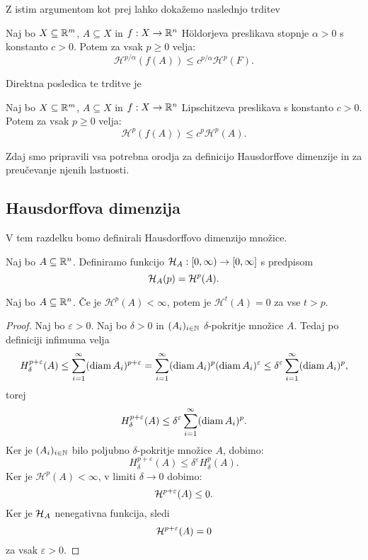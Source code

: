 Z istim argumentom kot prej lahko dokažemo naslednjo trditev
\begin{trditev}
    \label{mera-hold}
    Naj bo \(X \subseteq \mathbb{R}^m\), \(A \subseteq X\) in \(f: X \to \mathbb{R}^n\) Höldorjeva preslikava stopnje \(\alpha > 0\) s konstanto \(c > 0\). Potem za vsak \(p \geq 0\) velja:
    \[\mathcal{H}^{p/\alpha}(f(A)) \leq c^{p/\alpha} \mathcal{H}^p(F).\]
\end{trditev}

Direktna posledica te trditve je 
\begin{posledica}
    Naj bo \(X \subseteq \mathbb{R}^m\), \(A \subseteq X\) in \(f: X \to \mathbb{R}^n\) Lipschitzeva preslikava s konstanto \(c > 0\). Potem za vsak \(p \geq 0\) velja:
    \[\mathcal{H}^{p}(f(A)) \leq c^p \mathcal{H}^p(A).\]
\end{posledica}

Zdaj smo pripravili vsa potrebna orodja za definicijo Hausdorffove dimenzije in za preučevanje njenih lastnosti.

\subsection{Hausdorffova dimenzija}
V tem razdelku bomo definirali Hausdorffovo dimenzijo množice.

Naj bo \(A \subseteq \mathbb{R}^n\). Definiramo funkcijo \(\mathcal{H}_A: [0, \infty) \to [0, \infty]\) s predpisom 
\[\mathcal{H}_A(p) = \mathcal{H}^p(A).\]
\begin{lema}
    Naj bo \(A \subseteq \mathbb{R}^n\). Če je \(\mathcal{H}^{p}(A) < \infty\), potem je \(\mathcal{H}^{t}(A) = 0\) za vse \(t > p\).
\end{lema}

\begin{proof}
    Naj bo \(\varepsilon > 0\). Naj bo \(\delta > 0\) in \((A_i)_{i \in \mathbb{N}}\) \(\delta\)-pokritje množice \(A\). Tedaj po definiciji infimuma velja
    \[H^{p + \varepsilon}_\delta(A) \leq \sum_{i=1}^{\infty} (\operatorname{diam} A_i)^{p + \varepsilon} = \sum_{i=1}^{\infty} (\operatorname{diam} A_i)^{p} (\operatorname{diam} A_i)^{\varepsilon} \leq \delta^{\varepsilon} \sum_{i=1}^{\infty} (\operatorname{diam} A_i)^{p},\]
    torej 
    \[H^{p + \varepsilon}_\delta(A) \leq \delta^{\varepsilon} \sum_{i=1}^{\infty} (\operatorname{diam} A_i)^{p}.\]
    Ker je \((A_i)_{i \in \mathbb{N}}\) bilo poljubno \(\delta\)-pokritje množice \(A\), dobimo:
    \[H^{p + \varepsilon}_\delta(A) \leq \delta^{\varepsilon} H^{p}_\delta(A).\]
    Ker je \(\mathcal{H}^{p}(A) < \infty\), v limiti \(\delta \to 0\) dobimo:
    \[\mathcal{H}^{p + \varepsilon}(A) \leq 0.\]
    Ker je \(\mathcal{H}_A\) nenegativna funkcija, sledi
    \[\mathcal{H}^{p + \varepsilon}(A) = 0\]
    za vsak \(\varepsilon > 0\).
\end{proof}

